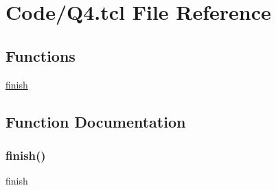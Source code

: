 \hypertarget{Q4_8tcl}{}\section{Code/\+Q4.tcl File Reference}
\label{Q4_8tcl}
\subsection*{Functions}
\begin{DoxyCompactItemize}
\item 
\mbox{\hyperlink{Q4_8tcl_a30728837c246b65ef76298af0101d99c}{finish}}
\end{DoxyCompactItemize}


\subsection{Function Documentation}
\mbox{\label{Q4_8tcl_a30728837c246b65ef76298af0101d99c}} 
\subsubsection{\texorpdfstring{finish()}{finish()}}
{\footnotesize\ttfamily finish}

